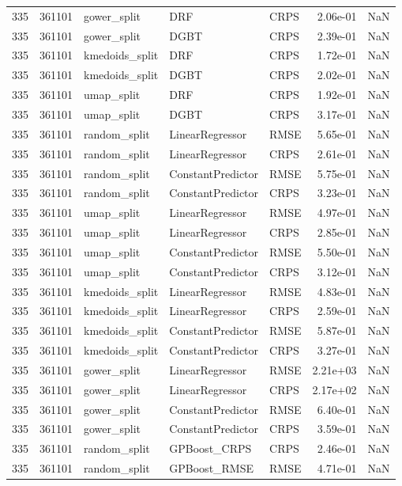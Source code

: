 \begin{tabular}{rrlllrr}
335 & 361101 & gower\_split & DRF & CRPS & 2.06e-01 & NaN \\
335 & 361101 & gower\_split & DGBT & CRPS & 2.39e-01 & NaN \\
335 & 361101 & kmedoids\_split & DRF & CRPS & 1.72e-01 & NaN \\
335 & 361101 & kmedoids\_split & DGBT & CRPS & 2.02e-01 & NaN \\
335 & 361101 & umap\_split & DRF & CRPS & 1.92e-01 & NaN \\
335 & 361101 & umap\_split & DGBT & CRPS & 3.17e-01 & NaN \\
335 & 361101 & random\_split & LinearRegressor & RMSE & 5.65e-01 & NaN \\
335 & 361101 & random\_split & LinearRegressor & CRPS & 2.61e-01 & NaN \\
335 & 361101 & random\_split & ConstantPredictor & RMSE & 5.75e-01 & NaN \\
335 & 361101 & random\_split & ConstantPredictor & CRPS & 3.23e-01 & NaN \\
335 & 361101 & umap\_split & LinearRegressor & RMSE & 4.97e-01 & NaN \\
335 & 361101 & umap\_split & LinearRegressor & CRPS & 2.85e-01 & NaN \\
335 & 361101 & umap\_split & ConstantPredictor & RMSE & 5.50e-01 & NaN \\
335 & 361101 & umap\_split & ConstantPredictor & CRPS & 3.12e-01 & NaN \\
335 & 361101 & kmedoids\_split & LinearRegressor & RMSE & 4.83e-01 & NaN \\
335 & 361101 & kmedoids\_split & LinearRegressor & CRPS & 2.59e-01 & NaN \\
335 & 361101 & kmedoids\_split & ConstantPredictor & RMSE & 5.87e-01 & NaN \\
335 & 361101 & kmedoids\_split & ConstantPredictor & CRPS & 3.27e-01 & NaN \\
335 & 361101 & gower\_split & LinearRegressor & RMSE & 2.21e+03 & NaN \\
335 & 361101 & gower\_split & LinearRegressor & CRPS & 2.17e+02 & NaN \\
335 & 361101 & gower\_split & ConstantPredictor & RMSE & 6.40e-01 & NaN \\
335 & 361101 & gower\_split & ConstantPredictor & CRPS & 3.59e-01 & NaN \\
335 & 361101 & random\_split & GPBoost\_CRPS & CRPS & 2.46e-01 & NaN \\
335 & 361101 & random\_split & GPBoost\_RMSE & RMSE & 4.71e-01 & NaN \\

\end{tabular}
